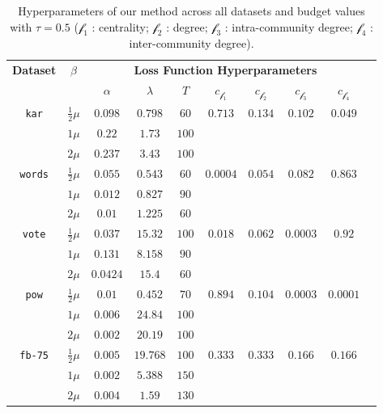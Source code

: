 \begin{table}[htpb]
    \centering
    \caption{Hyperparameters of our method across all datasets and budget values with $\tau=0.5$ ($\mathcal{f}_1$ : centrality; $\mathcal{f}_2$ : degree; $\mathcal{f}_3$ : intra-community degree; $\mathcal{f}_4$ : inter-community degree).}
    \label{tab:hyperparams}
    \begin{tabular}{cccccccccc}
        \toprule
        \multirow{2}{*}{\textbf{Dataset}} & \multirow{2}{*}{\textbf{$\beta$}} & \multicolumn{7}{c}{\textbf{Loss Function Hyperparameters}} \\
        \cmidrule(lr){3-9}
        & & $\alpha$ & $\lambda$ & $T$ & $c_{\mathcal{f}_1}$ & $c_{\mathcal{f}_2}$ & $c_{\mathcal{f}_3}$ & $c_{\mathcal{f}_4}$ \\
        \midrule
        \multirow{3}{*}{\texttt{kar}} 
        & $\frac{1}{2}\mu$ & $0.098$ & $0.798$ & $60$ & \multirow{3}{*}{$0.713$} & \multirow{3}{*}{$0.134$} & \multirow{3}{*}{$0.102$} & \multirow{3}{*}{$0.049$}  \\
        & $1\mu$ & $0.22$ & $1.73$ & $100$ & & & & \\
        & $2\mu$ & $0.237$ & $3.43$ & $100$ & & & & \\
        \midrule
        \multirow{3}{*}{\texttt{words}} 
        & $\frac{1}{2}\mu$ & $0.055$ & $0.543$ & $60$ & \multirow{3}{*}{$0.0004$} & \multirow{3}{*}{$0.054$} & \multirow{3}{*}{$0.082$} & \multirow{3}{*}{$0.863$} \\
        & $1\mu$ & $0.012$ & $0.827$ & $90$ & & & & \\
        & $2\mu$ & $0.01$ & $1.225$ & $60$ & & & & \\
        \midrule
        \multirow{3}{*}{\texttt{vote}} 
        & $\frac{1}{2}\mu$ & $0.037$ & $15.32$ & $100$ & \multirow{3}{*}{$0.018$} & \multirow{3}{*}{$0.062$} & \multirow{3}{*}{$0.0003$} & \multirow{3}{*}{$0.92$}\\
        & $1\mu$ & $0.131$ & $8.158$ & $90$ & & & & \\
        & $2\mu$ & $0.0424$ & $15.4$ & $60$ & & & & \\
        \midrule
        \multirow{3}{*}{\texttt{pow}} 
        & $\frac{1}{2}\mu$ & $0.01$ & $0.452$ & $70$ &  \multirow{3}{*}{$0.894$} & \multirow{3}{*}{$0.104$} & \multirow{3}{*}{$0.0003$} & \multirow{3}{*}{$0.0001$} \\
        & $1\mu$ & $0.006$ & $24.84$ & $100$ & & & & \\
        & $2\mu$ & $0.002$ & $20.19$ & $100$ & & & & \\
        \midrule
        \multirow{3}{*}{\texttt{fb-75}} 
        & $\frac{1}{2}\mu$ & $0.005$ & $19.768$ & $100$ & \multirow{3}{*}{$0.333$} & \multirow{3}{*}{$0.333$} & \multirow{3}{*}{$0.166$} & \multirow{3}{*}{$0.166$}\\
        & $1\mu$ & $0.002$ & $5.388$ & $150$ & & & & \\
        & $2\mu$ & $0.004$ & $1.59$ & $130$ & & & & \\
        \bottomrule
    \end{tabular}
\end{table}





